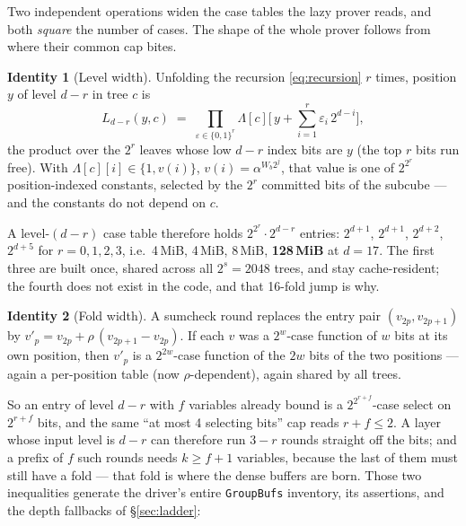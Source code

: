 \documentclass[11pt]{article}
\newcommand{\bits}{\{0,1\}}
\newcommand{\code}[1]{{\def\_{\textunderscore\allowbreak}\texttt{#1}}}
\theoremstyle{definition}
\newtheorem{identity}{Identity}
\begin{document}
Two independent operations widen the case tables the lazy prover reads,
and both \emph{square} the number of cases.  The shape of the whole
prover follows from where their common cap bites.

\begin{identity}[Level width]\label{id:level}
Unfolding the recursion \eqref{eq:recursion} $r$ times, position $y$ of
level $d - r$ in tree $c$ is
\[
  L_{d-r}(y, c) \;=\;
  \prod_{\varepsilon \in \bits^{r}}
    \Lambda[c]\Big[\, y + \sum_{i=1}^{r}\varepsilon_i\, 2^{d-i}\Big] ,
\]
the product over the $2^r$ leaves whose low $d-r$ index bits are $y$
(the top $r$ bits run free).  With $\Lambda[c][i] \in \{1, v(i)\}$,
$v(i) = \alpha^{W_b 2^j}$, that value is one of $2^{2^r}$
position-indexed constants, selected by the $2^r$ committed bits of the
subcube --- and the constants do not depend on $c$.
\end{identity}

A level-$(d{-}r)$ case table therefore holds
$2^{2^r}\!\cdot 2^{d-r}$ entries: $2^{d+1}$, $2^{d+1}$, $2^{d+2}$,
$2^{d+5}$ for $r = 0, 1, 2, 3$, i.e.\ 4\,MiB, 4\,MiB, 8\,MiB,
\textbf{128\,MiB} at $d = 17$.  The first three are built once, shared
across all $2^s = 2048$ trees, and stay cache-resident; the fourth does
not exist in the code, and that 16-fold jump is why.

\begin{identity}[Fold width]\label{id:fold}
A sumcheck round replaces the entry pair $(v_{2p}, v_{2p+1})$ by
$v'_p = v_{2p} + \rho\,(v_{2p+1} - v_{2p})$.  If each $v$ was a
$2^w$-case function of $w$ bits at its own position, then $v'_p$ is a
$2^{2w}$-case function of the $2w$ bits of the two positions --- again a
per-position table (now $\rho$-dependent), again shared by all trees.
\end{identity}

So an entry of level $d - r$ with $f$ variables already bound is a
$2^{2^{r+f}}$-case select on $2^{r+f}$ bits, and the same
``at most 4 selecting bits'' cap reads $r + f \le 2$.  A layer whose
input level is $d - r$ can therefore run $3 - r$ rounds straight off the
bits; and a prefix of $f$ such rounds needs $k \ge f + 1$ variables,
because the last of them must still have a fold --- that fold is where
the dense buffers are born.  Those two inequalities generate the
driver's entire \code{GroupBufs} inventory, its assertions, and the
depth fallbacks of \S\ref{sec:ladder}:
\end{document}
